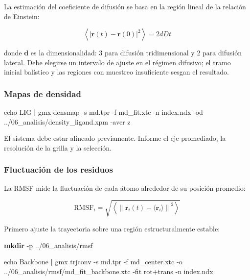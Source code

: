 \documentclass[
  spanish,
  11pt,
  a4paper]{article}
\newenvironment{Shaded}{\begin{snugshade}}{\end{snugshade}}
\newcommand{\AttributeTok}[1]{\textcolor[rgb]{0.13,0.29,0.53}{#1}}
\newcommand{\BuiltInTok}[1]{#1}
\newcommand{\ExtensionTok}[1]{#1}
\newcommand{\FunctionTok}[1]{\textcolor[rgb]{0.13,0.29,0.53}{\textbf{#1}}}
\newcommand{\KeywordTok}[1]{\textcolor[rgb]{0.13,0.29,0.53}{\textbf{#1}}}
\newcommand{\NormalTok}[1]{#1}
\begin{document}
La estimación del coeficiente de difusión se basa en la región lineal de
la relación de Einstein:

\[
\left\langle |\mathbf r(t)-\mathbf r(0)|^2\right\rangle=2dDt
\]

donde \textbf{d} es la dimensionalidad: 3 para difusión tridimensional y
2 para difusión lateral. Debe elegirse un intervalo de ajuste en el
régimen difusivo; el tramo inicial balístico y las regiones con muestreo
insuficiente sesgan el resultado.

\subsubsection{Mapas de densidad}\label{mapas-de-densidad}

\begin{Shaded}
\begin{Highlighting}[]
\BuiltInTok{echo}\NormalTok{ LIG }\KeywordTok{|}
\ExtensionTok{gmx}\NormalTok{ densmap     }\AttributeTok{{-}s}\NormalTok{ md.tpr     }\AttributeTok{{-}f}\NormalTok{ md\_fit.xtc     }\AttributeTok{{-}n}\NormalTok{ index.ndx     }\AttributeTok{{-}od}\NormalTok{ ../06\_analisis/density\_ligand.xpm     }\AttributeTok{{-}aver}\NormalTok{ z}
\end{Highlighting}
\end{Shaded}

El sistema debe estar alineado previamente. Informe el eje promediado,
la resolución de la grilla y la selección.

\subsubsection{Fluctuación de los
residuos}\label{fluctuaciuxf3n-de-los-residuos}

La RMSF mide la fluctuación de cada átomo alrededor de su posición
promedio:

\[
\mathrm{RMSF}_i=
\sqrt{
\left\langle
\left\|\mathbf r_i(t)-\langle\mathbf r_i\rangle\right\|^2
\right\rangle}
\]

Primero ajuste la trayectoria sobre una región estructuralmente estable:

\begin{Shaded}
\begin{Highlighting}[]
\FunctionTok{mkdir} \AttributeTok{{-}p}\NormalTok{ ../06\_analisis/rmsf}

\BuiltInTok{echo}\NormalTok{ Backbone }\KeywordTok{|}
\ExtensionTok{gmx}\NormalTok{ trjconv     }\AttributeTok{{-}s}\NormalTok{ md.tpr     }\AttributeTok{{-}f}\NormalTok{ md\_center.xtc     }\AttributeTok{{-}o}\NormalTok{ ../06\_analisis/rmsf/md\_fit\_backbone.xtc     }\AttributeTok{{-}fit}\NormalTok{ rot+trans     }\AttributeTok{{-}n}\NormalTok{ index.ndx}
\end{Highlighting}
\end{Shaded}
\end{document}
